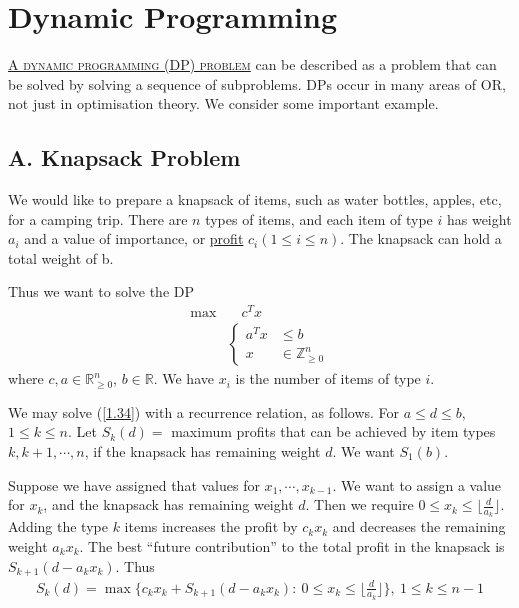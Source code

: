 \section{Dynamic Programming}
\uline{\textcolor{MarkerColour}{\textsc{A dynamic programming (DP) problem}}} can be described as a problem that can be solved by solving a sequence of subproblems. DPs occur in many areas of OR, not just in optimisation theory. We consider some important example.
\subsection{A. Knapsack Problem}
We would like to prepare a knapsack of items, such as water bottles, apples, etc, for a camping trip. There are $n$ types of items, and each item of type $i$ has weight $a_i$ and a value of importance, or \uline{profit} $c_i (1\leqslant i\leqslant n)$. The knapsack can hold a total weight of b.

Thus we want to solve the DP
\begin{align}
    \max &\quad c^T x \nonumber \\
    &\left\lbrace\begin{array}{ll}
         a^Tx&\leqslant b  \\
         x&\in\mathbb{Z}_{\geqslant 0}^n
    \end{array}\right. \label{1.34}
\end{align}
where $c, a\in\mathbb{R}^n_{\geqslant 0}$, $b\in\mathbb{R}$. We have $x_i$ is the number of items of type $i$.

We may solve (\ref{1.34}) with a recurrence relation, as follows. For $a\leqslant d\leqslant b$, $1\leqslant k\leqslant n$. Let $S_k(d) =$ maximum profits that can be achieved by item types $k, k+1, \cdots, n$, if the knapsack has remaining weight $d$. We want $S_1(b)$.

Suppose we have assigned that values for $x_1, \cdots, x_{k-1}$. We want to assign a value for $x_k$, and the knapsack has remaining weight $d$. Then we require $0\leqslant x_k\leqslant \lfloor \frac{d}{a_k}\rfloor$. Adding the type $k$ items increases the profit by $c_kx_k$ and decreases the remaining weight $a_kx_k$. The best ``future contribution'' to the total profit in the knapsack is $S_{k+1}(d-a_kx_k)$. Thus 
\begin{align}
    S_k(d) = \max\{ c_k x_k + S_{k+1}(d-a_kx_k):\ 0\leqslant x_k\leqslant \lfloor\frac{d}{a_k}\rfloor\}, \ 1\leqslant k\leqslant n-1 \label{1.35}
\end{align}

